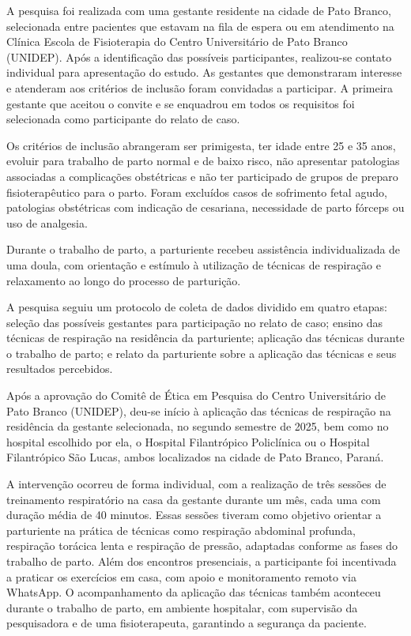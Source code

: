 \documentclass[openright]{tex/estilos/normas-utf-tex}
\begin{document}
A pesquisa foi realizada com uma gestante residente na cidade de Pato Branco, selecionada entre pacientes que estavam na fila de espera ou em atendimento na Clínica Escola de Fisioterapia do Centro Universitário de Pato Branco (UNIDEP). Após a identificação das possíveis participantes, realizou-se contato individual para apresentação do estudo. As gestantes que demonstraram interesse e atenderam aos critérios de inclusão foram convidadas a participar. A primeira gestante que aceitou o convite e se enquadrou em todos os requisitos foi selecionada como participante do relato de caso.

Os critérios de inclusão abrangeram ser primigesta, ter idade entre 25 e 35 anos, evoluir para trabalho de parto normal e de baixo risco, não apresentar patologias associadas a complicações obstétricas e não ter participado de grupos de preparo fisioterapêutico para o parto. Foram excluídos casos de sofrimento fetal agudo, patologias obstétricas com indicação de cesariana, necessidade de parto fórceps ou uso de analgesia.

Durante o trabalho de parto, a parturiente recebeu assistência individualizada de uma doula, com orientação e estímulo à utilização de técnicas de respiração e relaxamento ao longo do processo de parturição.

A pesquisa seguiu um protocolo de coleta de dados dividido em quatro etapas: seleção das possíveis gestantes para participação no relato de caso; ensino das técnicas de respiração na residência da parturiente; aplicação das técnicas durante o trabalho de parto; e relato da parturiente sobre a aplicação das técnicas e seus resultados percebidos.

Após a aprovação do Comitê de Ética em Pesquisa do Centro Universitário de Pato Branco (UNIDEP), deu-se início à aplicação das técnicas de respiração na residência da gestante selecionada, no segundo semestre de 2025, bem como no hospital escolhido por ela, o Hospital Filantrópico Policlínica ou o Hospital Filantrópico São Lucas, ambos localizados na cidade de Pato Branco, Paraná.

A intervenção ocorreu de forma individual, com a realização de três sessões de treinamento respiratório na casa da gestante durante um mês, cada uma com duração média de 40 minutos. Essas sessões tiveram como objetivo orientar a parturiente na prática de técnicas como respiração abdominal profunda, respiração torácica lenta e respiração de pressão, adaptadas conforme as fases do trabalho de parto. Além dos encontros presenciais, a participante foi incentivada a praticar os exercícios em casa, com apoio e monitoramento remoto via WhatsApp. O acompanhamento da aplicação das técnicas também aconteceu durante o trabalho de parto, em ambiente hospitalar, com supervisão da pesquisadora e de uma fisioterapeuta, garantindo a segurança da paciente.
\end{document}
